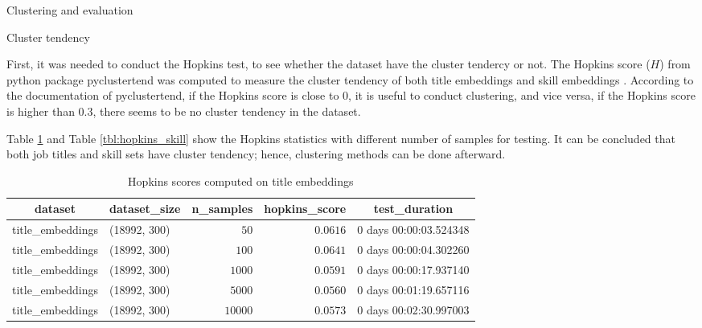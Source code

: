 \documentclass[a4paper,man,floatsintext,natbib,noextraspace]{apa6}
\makeatletter
\renewcommand{\subsection}{\@startsection{subsection}{2}
  {\z@}
  {\b@level@two@skip}
  {\e@level@two@skip}
  {\normalfont\normalsize\bfseries}}
\renewcommand{\subsubsection}{\@startsection{subsubsection}{3}
  {\z@}
  {\b@level@two@skip}
  {\e@level@two@skip}
  {\normalfont\normalsize\bfseries\itshape}}
\makeatother
\begin{document}
\subsection{Clustering and evaluation}

\subsubsection{Cluster tendency}

First, it was needed to conduct the Hopkins test, to see whether the dataset have the cluster tendercy or not. The Hopkins score ($H$) from python package pyclustertend was computed to measure the cluster tendency of both title embeddings and skill embeddings \citep{ismaillachhebLachheboPyclustertendV12021}. According to the documentation of pyclustertend, if the Hopkins score is close to 0, it is useful to conduct clustering, and vice versa, if the Hopkins score is higher than 0.3, there seems to be no cluster tendency in the dataset.

Table \ref{tbl:hopkins_title} and Table \ref{tbl:hopkins_skill} show the Hopkins statistics with different number of samples for testing. It can be concluded that both job titles and skill sets have cluster tendency; hence, clustering methods can be done afterward.

\begin{table}[!htbp]
    \caption{Hopkins scores computed on title embeddings\label{tbl:hopkins_title}} 
    \begin{center}
    \begin{tabular}{llrrl}
    \hline\hline
    \multicolumn{1}{c}{dataset}&\multicolumn{1}{c}{dataset\_size}&\multicolumn{1}{c}{n\_samples}&\multicolumn{1}{c}{hopkins\_score}&\multicolumn{1}{c}{test\_duration}\tabularnewline
    \hline
    title\_embeddings&(18992, 300)&$   50$&$0.0616$&0 days 00:00:03.524348\tabularnewline
    title\_embeddings&(18992, 300)&$  100$&$0.0641$&0 days 00:00:04.302260\tabularnewline
    title\_embeddings&(18992, 300)&$ 1000$&$0.0591$&0 days 00:00:17.937140\tabularnewline
    title\_embeddings&(18992, 300)&$ 5000$&$0.0560$&0 days 00:01:19.657116\tabularnewline
    title\_embeddings&(18992, 300)&$10000$&$0.0573$&0 days 00:02:30.997003\tabularnewline
    \hline
    \end{tabular}\end{center}
    \end{table}
\end{document}
